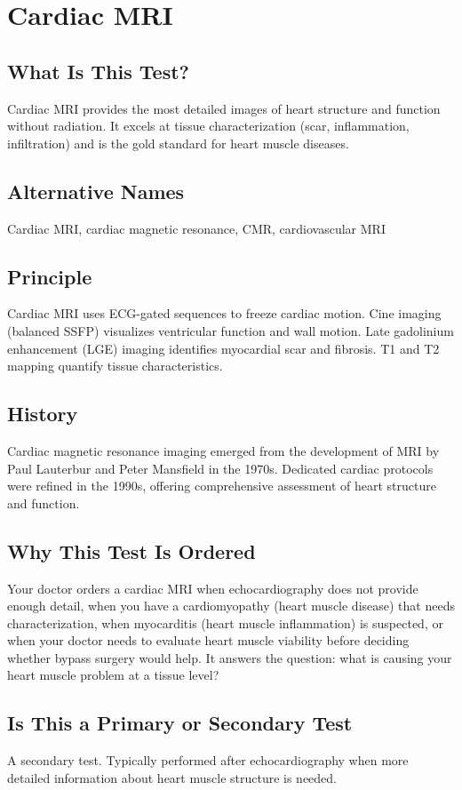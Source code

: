 \chapter{Cardiac MRI}

\section*{What Is This Test?}
Cardiac MRI provides the most detailed images of heart structure and function without radiation. It excels at tissue characterization (scar, inflammation, infiltration) and is the gold standard for heart muscle diseases.

\section*{Alternative Names}
Cardiac MRI, cardiac magnetic resonance, CMR, cardiovascular MRI


\section*{Principle}
Cardiac MRI uses ECG-gated sequences to freeze cardiac motion. Cine imaging (balanced SSFP) visualizes ventricular function and wall motion. Late gadolinium enhancement (LGE) imaging identifies myocardial scar and fibrosis. T1 and T2 mapping quantify tissue characteristics.

\section*{History}
Cardiac magnetic resonance imaging emerged from the development of MRI by Paul Lauterbur and Peter Mansfield in the 1970s. Dedicated cardiac protocols were refined in the 1990s, offering comprehensive assessment of heart structure and function.

\section*{Why This Test Is Ordered}
Your doctor orders a cardiac MRI when echocardiography does not provide enough detail, when you have a cardiomyopathy (heart muscle disease) that needs characterization, when myocarditis (heart muscle inflammation) is suspected, or when your doctor needs to evaluate heart muscle viability before deciding whether bypass surgery would help. It answers the question: what is causing your heart muscle problem at a tissue level?

\section*{Is This a Primary or Secondary Test}
A secondary test. Typically performed after echocardiography when more detailed information about heart muscle structure is needed.

